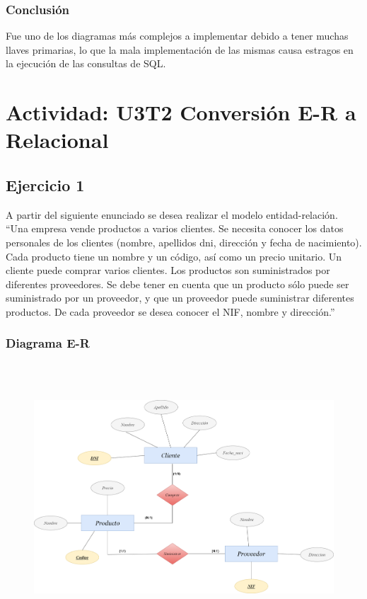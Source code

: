 \documentclass[a4paper, 12pt]{article}
\begin{document}
\begin{justify}
        \subsubsection{Conclusión}
        \justify
        Fue uno de los diagramas más complejos a implementar debido a tener muchas llaves primarias, lo que la mala implementación de las mismas causa estragos en la ejecución de las consultas de SQL.
        \section{Actividad: U3T2 Conversión E-R a Relacional}
        \subsection{Ejercicio 1}
        \justify
        A partir del siguiente enunciado se desea realizar el modelo entidad-relación.
        ``Una empresa vende productos a varios clientes. Se necesita conocer los datos personales de los clientes
        (nombre, apellidos dni, dirección y fecha de nacimiento). Cada producto tiene un nombre y un código, así como un precio
        unitario. Un cliente puede comprar varios clientes. Los productos son suministrados por diferentes proveedores.
        Se debe tener en cuenta que un producto sólo puede ser suministrado por un proveedor, y que un proveedor puede
        suministrar diferentes productos. De cada proveedor se desea conocer el NIF, nombre y dirección.''
        \subsubsection{Diagrama E-R}
        \begin{figure}[H]
            \centering
            \includegraphics[width=16cm,height=10cm]{er1.png}
        \end{figure}

\end{justify}
\end{document}
